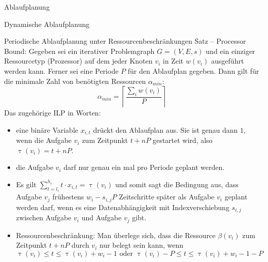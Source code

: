 \begin{chapter}{Ablaufplanung}
\begin{section}{Dynamische Ablaufplanung}
\begin{subsection}{Periodische Ablaufplanung unter Ressourcenbeschränkungen}
    \f{Satz -- Processor Bound:} Gegeben sei ein iterativer Problemgraph $G = (V,E,s)$ und ein einziger Ressourcetyp (Prozessor) auf dem jeder Knoten $v_i$ in Zeit $w(v_i)$ ausgeführt werden kann. Ferner sei eine Periode $P$ für den Ablaufplan gegeben. Dann gilt für die minimale Zahl von benötigten Ressourcen $\alpha_{min}$:
    \[ \alpha_{min} = \left\lceil \frac{\sum_i w(v_i)}{P} \right\rceil \]
    Das zugehörige ILP in Worten:
    \begin{itemize}
     \item eine binäre Variable $x_{i,t}$ drückt den Ablaufplan aus. Sie ist genau dann $1$, wenn die Aufgabe $v_i$ zum Zeitpunkt $t+nP$ gestartet wird, also $\uptau (v_i) = t+nP$.
     \item die Aufgabe $v_i$ darf nur genau ein mal pro Periode geplant werden.
     \item Es gilt $ \sum_{t=l_i}^{h_i} t\cdot x_{i,t} = \uptau(v_i) $ und somit sagt die Bedingung aus, dass Aufgabe $v_j$ frühestens $w_i - s_{i,j} P$ Zeitschritte später als Aufgabe $v_i$ geplant werden darf, wenn es eine Datenabhängigkeit mit Indexverschiebung $s_{i,j}$ zwischen Aufgabe $v_i$ und Aufgabe $v_j$ gibt.
     \item Ressourcenbeschränkung: Man überlege sich, dass die Ressource $\beta(v_i)$ zum Zeitpunkt $t + nP$ durch $v_i$ nur belegt sein kann, wenn
     \[ \uptau(v_i) \leq t \leq \uptau(v_i) + w_i -1 \text{ oder } \uptau(v_i)-P \leq t \leq \uptau(v_i) + w_i -1 -P \]
    \end{itemize}
   \end{subsection}
  \end{section}
\end{chapter}
